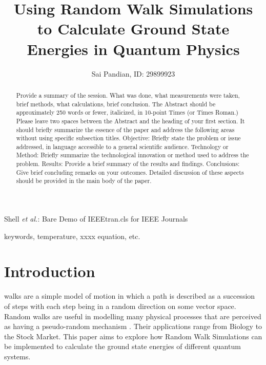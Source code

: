 \documentclass[journal]{IEEEtran}
\begin{document}
\title{Using Random Walk Simulations to Calculate Ground State Energies in Quantum Physics}

\author{Sai Pandian, ID: 29899923}%
        
{Shell \MakeLowercase{\textit{et al.}}: Bare Demo of IEEEtran.cls for IEEE Journals}

\maketitle

\begin{abstract}
Provide a summary of the session. What was done, what measurements were taken,
brief methods, what calculations, brief conclusion.  The Abstract should be
approximately 250 words or fewer, italicized, in 10-point Times (or Times
Roman.) Please leave two spaces between the Abstract and the heading of your
first section.  It should briefly summarize the essence of the paper and address
the following areas without using specific subsection titles. Objective: Briefly
state the problem or issue addressed, in language accessible to a general
scientific audience. Technology or Method: Briefly summarize the technological
innovation or method used to address the problem. Results: Provide a brief
summary of the results and findings. Conclusions: Give brief concluding remarks
on your outcomes. Detailed discussion of these aspects should be provided in the
main body of the paper.
\end{abstract}

\begin{IEEEkeywords}
keywords, temperature, xxxx equation, etc.
\end{IEEEkeywords}

\section{Introduction}

 walks are a simple model of motion in which a path is
described as a succession of steps with each step being in a random direction on
some vector space. Random walks are useful in modelling many physical processes
that are perceived as having a pseudo-random mechanism . Their
applications range from Biology to the Stock Market. This paper aims to explore
how Random Walk Simulations can be implemented to calculate the ground state
energies of different quantum systems. 
\end{document}
